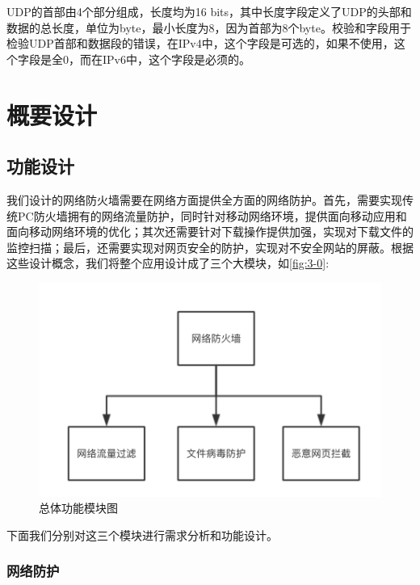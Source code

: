 \documentclass[format=final, language=chinese, degree=fyp]{hustthesis}
\begin{document}
UDP的首部由4个部分组成，长度均为16 bits，其中长度字段定义了UDP的头部和数据的总长度，单位为byte，最小长度为8，因为首部为8个byte。校验和字段用于检验UDP首部和数据段的错误，在IPv4中，这个字段是可选的，如果不使用，这个字段是全0，而在IPv6中，这个字段是必须的。


\chapter{概要设计}

\section{功能设计}

我们设计的网络防火墙需要在网络方面提供全方面的网络防护。首先，需要实现传统PC防火墙拥有的网络流量防护，同时针对移动网络环境，提供面向移动应用和面向移动网络环境的优化；其次还需要针对下载操作提供加强，实现对下载文件的监控扫描；最后，还需要实现对网页安全的防护，实现对不安全网站的屏蔽。根据这些设计概念，我们将整个应用设计成了三个大模块，如\autoref{fig:3-0}:

\begin{figure}[!h]
\centering
\includegraphics[width=1\textwidth]{function_all.png}
\caption{总体功能模块图}\label{fig:3-0}
\end{figure}


下面我们分别对这三个模块进行需求分析和功能设计。

\subsection{网络防护}
\end{document}
